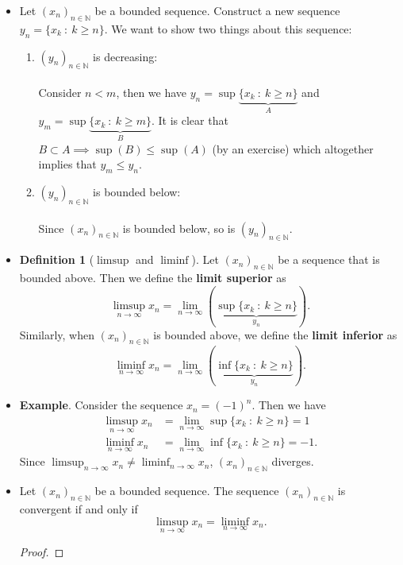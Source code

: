 \documentclass{article}
\newcommand{\N}{\mathbb{N}}
\newcommand{\seq}[2]{(#1_{#2})_{#2 \in \N}}
\newcommand{\mylimmm}[2]{\lim\limits_{#1 \to #2}}
\newcommand{\?}{\stackrel{?}{=}}
\theoremstyle{definition} %
\newtheorem{definition}[subsection]{Definition} %
\begin{document}
\begin{itemize}
    \item Let $\seq{x}{n}$ be a bounded sequence. Construct a new sequence $y_n = \{x_k \ : \ k \geq n\}$. We want to show two things about this sequence:
    \begin{enumerate}[label=(\arabic*)]
        \item $\seq{y}{n}$ is decreasing: \\\\
        Consider $n < m$, then we have $y_n = \sup\underbrace{\{x_k \ : \ k \geq n\}}_{A}$ and $y_m = \sup\underbrace{\{x_k \ : \ k \geq m\}}_{B}$. It is clear that $B \subset A \implies \sup(B) \leq \sup(A)$ (by an exercise) which altogether implies that $y_m \leq y_n$.
        \item $\seq{y}{n}$ is bounded below: \\\\
        Since $\seq{x}{n}$ is bounded below, so is $\seq{y}{n}$.
    \end{enumerate}
    \item[]
    \begin{definition}[$\limsup$ and $\liminf$]
        Let $\seq{x}{n}$ be a sequence that is bounded above. Then we define the \textbf{limit superior} as
    $$\limsup_{n \to \infty} x_n = \mylimmm{n}{\infty} \left(\underbrace{\sup\{x_k \ : \ k \geq n\}}_{y_n}\right).$$
    Similarly, when $\seq{x}{n}$ is bounded above, we define the \textbf{limit inferior} as
    $$\liminf_{n \to \infty} x_n = \mylimmm{n}{\infty} \left(\underbrace{\inf\{x_k \ : \ k \geq n\}}_{y_n}\right).$$
    \end{definition}
    \item \textbf{Example}. Consider the sequence $x_n = (-1)^n$. Then we have
    \begin{align*}
        \limsup_{n \to \infty} x_n &= \mylimmm{n}{\infty} \sup\{x_k \ : \ k \geq n\} = 1 \\
        \liminf_{n \to \infty} x_n &= \mylimmm{n}{\infty} \inf\{x_k \ : \ k \geq n\} = -1.
    \end{align*}
    Since $\limsup_{n \to \infty} x_n \neq \liminf_{n \to \infty} x_n$, $\seq{x}{n}$ diverges.
    \item[]
    \begin{theorem}
        Let $\seq{x}{n}$ be a bounded sequence. The sequence $\seq{x}{n}$ is convergent if and only if
    $$\limsup_{n \to \infty} x_n = \liminf_{n \to \infty} x_n.$$
    \end{theorem}
    \begin{proof}

\end{proof}
\end{itemize}
\end{document}
